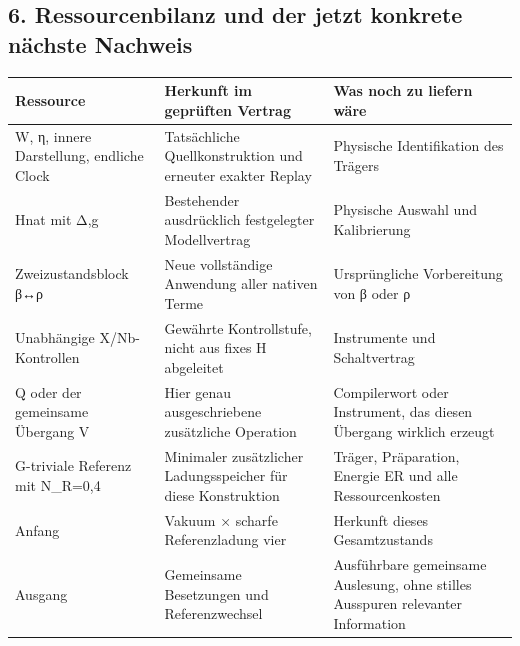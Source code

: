 \subsection{6. Ressourcenbilanz und der jetzt konkrete nächste
Nachweis}\label{ressourcenbilanz-und-der-jetzt-konkrete-nuxe4chste-nachweis}

{\def\LTcaptype{none} %
\begin{longtable}[]{@{}
  >{\raggedright\arraybackslash}p{}
  >{\raggedright\arraybackslash}p{}
  >{\raggedright\arraybackslash}p{}@{}}
\toprule\noalign{}
\begin{minipage}[b]{\linewidth}\raggedright
Ressource
\end{minipage} & \begin{minipage}[b]{\linewidth}\raggedright
Herkunft im geprüften Vertrag
\end{minipage} & \begin{minipage}[b]{\linewidth}\raggedright
Was noch zu liefern wäre
\end{minipage} \\
\midrule\noalign{}
\endhead
\bottomrule\noalign{}
\endlastfoot
W, η, innere Darstellung, endliche Clock & Tatsächliche
Quellkonstruktion und erneuter exakter Replay & Physische Identifikation
des Trägers \\
Hnat mit Δ,g & Bestehender ausdrücklich festgelegter Modellvertrag &
Physische Auswahl und Kalibrierung \\
Zweizustandsblock β↔ρ & Neue vollständige Anwendung aller nativen Terme
& Ursprüngliche Vorbereitung von β oder ρ \\
Unabhängige X/Nb-Kontrollen & Gewährte Kontrollstufe, nicht aus fixes H
abgeleitet & Instrumente und Schaltvertrag \\
Q oder der gemeinsame Übergang V & Hier genau ausgeschriebene
zusätzliche Operation & Compilerwort oder Instrument, das diesen
Übergang wirklich erzeugt \\
G-triviale Referenz mit N\_R=0,4 & Minimaler zusätzlicher
Ladungsspeicher für diese Konstruktion & Träger, Präparation, Energie ER
und alle Ressourcenkosten \\
Anfang & Vakuum × scharfe Referenzladung vier & Herkunft dieses
Gesamtzustands \\
Ausgang & Gemeinsame Besetzungen und Referenzwechsel & Ausführbare
gemeinsame Auslesung, ohne stilles Ausspuren relevanter Information \\
\end{longtable}
}

